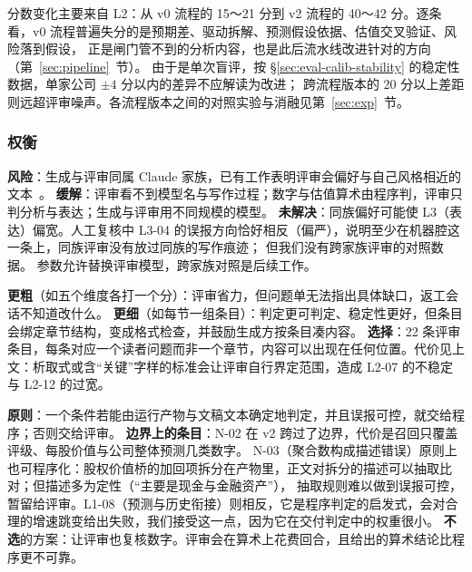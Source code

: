 分数变化主要来自 L2：从 v0 流程的 15～21 分到 v2 流程的 40～42 分。逐条看，v0 流程普遍失分的是预期差、驱动拆解、预测假设依据、估值交叉验证、风险落到假设，
正是闸门管不到的分析内容，也是此后流水线改进针对的方向（第~\ref{sec:pipeline}~节）。
由于是单次盲评，按 \S\ref{sec:eval-calib-stability} 的稳定性数据，单家公司 $\pm 4$ 分以内的差异不应解读为改进；
跨流程版本的 20 分以上差距则远超评审噪声。各流程版本之间的对照实验与消融见第~\ref{sec:exp}~节。

\subsubsection{权衡}

\begin{tradeoff}
\textbf{风险}：生成与评审同属 Claude 家族，已有工作表明评审会偏好与自己风格相近的文本~\citep{panickssery2024self}。
\textbf{缓解}：评审看不到模型名与写作过程；数字与估值算术由程序判，评审只判分析与表达；生成与评审用不同规模的模型。
\textbf{未解决}：同族偏好可能使 L3（表达）偏宽。人工复核中 L3-04 的误报方向恰好相反（偏严），说明至少在机器腔这一条上，同族评审没有放过同族的写作痕迹；
但我们没有跨家族评审的对照数据。 参数允许替换评审模型，跨家族对照是后续工作。
\end{tradeoff}

\begin{tradeoff}[：评分标准的粒度]
\textbf{更粗}（如五个维度各打一个分）：评审省力，但问题单无法指出具体缺口，返工会话不知道改什么。
\textbf{更细}（如每节一组条目）：判定更可判定、稳定性更好，但条目会绑定章节结构，变成格式检查，并鼓励生成方按条目凑内容。
\textbf{选择}：22 条评审条目，每条对应一个读者问题而非一个章节，内容可以出现在任何位置。代价见上文：析取式或含“关键”字样的标准会让评审自行界定范围，造成 L2-07 的不稳定与 L2-12 的过宽。
\end{tradeoff}

\begin{tradeoff}[：程序判与模型判的边界]
\textbf{原则}：一个条件若能由运行产物与文稿文本确定地判定，并且误报可控，就交给程序；否则交给评审。
\textbf{边界上的条目}：N-02 在 v2 跨过了边界，代价是召回只覆盖评级、每股价值与公司整体预测几类数字。
N-03（聚合数构成描述错误）原则上也可程序化：股权价值桥的加回项拆分在产物里，正文对拆分的描述可以抽取比对；但描述多为定性（“主要是现金与金融资产”），
抽取规则难以做到误报可控，暂留给评审。L1-08（预测与历史衔接）则相反，它是程序判定的启发式，会对合理的增速跳变给出失败，我们接受这一点，因为它在交付判定中的权重很小。
\textbf{不选}的方案：让评审也复核数字。评审会在算术上花费回合，且给出的算术结论比程序更不可靠。
\end{tradeoff}

